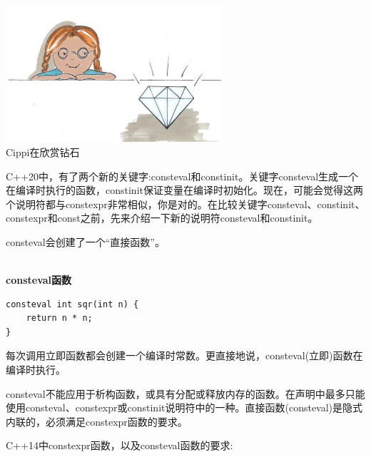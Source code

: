 \begin{center}
\includegraphics[width=0.6\textwidth]{content/3/chapter4/images/36.png}\\
Cippi在欣赏钻石
\end{center}

C++20中，有了两个新的关键字:consteval和constinit。关键字consteval生成一个在编译时执行的函数，constinit保证变量在编译时初始化。现在，可能会觉得这两个说明符都与constexpr非常相似，你是对的。在比较关键字consteval、constinit、constexpr和const之前，先来介绍一下新的说明符consteval和constinit。


consteval会创建了一个“直接函数”。

\hspace*{\fill} \\ %
\noindent
\textbf{consteval函数}
\begin{lstlisting}[style=styleCXX]
consteval int sqr(int n) {
	return n * n;
}
\end{lstlisting}

每次调用立即函数都会创建一个编译时常数。更直接地说，consteval(立即)函数在编译时执行。

consteval不能应用于析构函数，或具有分配或释放内存的函数。在声明中最多只能使用consteval、constexpr或constinit说明符中的一种。直接函数(consteval)是隐式内联的，必须满足constexpr函数的要求。

C++14中constexpr函数，以及consteval函数的要求:

